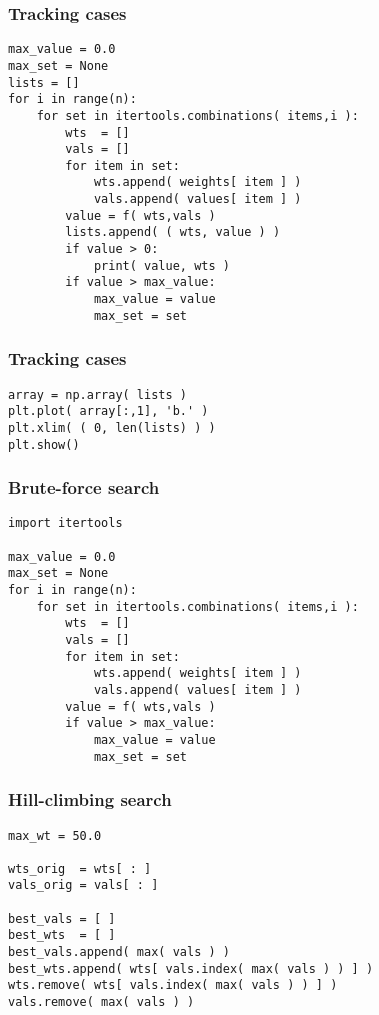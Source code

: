 \documentclass[11pt]{beamer}
\begin{document}
\begin{frame}[fragile]
  \frametitle{Tracking cases}

  \begin{Verbatim}
max_value = 0.0
max_set = None
lists = []
for i in range(n):
    for set in itertools.combinations( items,i ):
        wts  = []
        vals = []
        for item in set:
            wts.append( weights[ item ] )
            vals.append( values[ item ] )
        value = f( wts,vals )
        lists.append( ( wts, value ) )
        if value > 0:
            print( value, wts )
        if value > max_value:
            max_value = value
            max_set = set
  \end{Verbatim}
\end{frame}

\begin{frame}[fragile]
  \frametitle{Tracking cases}

  \begin{Verbatim}
array = np.array( lists )
plt.plot( array[:,1], 'b.' )
plt.xlim( ( 0, len(lists) ) )
plt.show()
  \end{Verbatim}
\end{frame}

\begin{frame}[fragile]
  \frametitle{Brute-force search}

  \begin{Verbatim}
import itertools

max_value = 0.0
max_set = None
for i in range(n):
    for set in itertools.combinations( items,i ):
        wts  = []
        vals = []
        for item in set:
            wts.append( weights[ item ] )
            vals.append( values[ item ] )
        value = f( wts,vals )
        if value > max_value:
            max_value = value
            max_set = set
  \end{Verbatim}
\end{frame}

\begin{frame}[fragile]
  \frametitle{Hill-climbing search}

  \begin{Verbatim}
max_wt = 50.0

wts_orig  = wts[ : ]
vals_orig = vals[ : ]

best_vals = [ ]
best_wts  = [ ]
best_vals.append( max( vals ) )
best_wts.append( wts[ vals.index( max( vals ) ) ] )
wts.remove( wts[ vals.index( max( vals ) ) ] )
vals.remove( max( vals ) )
  \end{Verbatim}
\end{frame}
\end{document}
